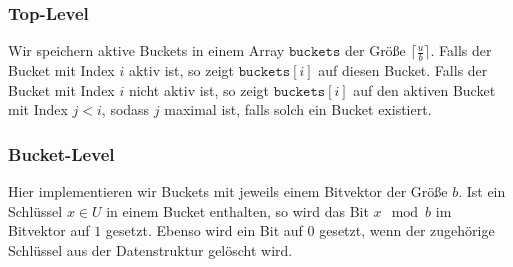 \subsubsection{Top-Level}

Wir speichern aktive Buckets in einem Array $\texttt{buckets}$ der Größe $\lceil \tfrac{u}{b} \rceil$. Falls der Bucket mit Index $i$ aktiv ist, so zeigt $\texttt{buckets}[i]$ auf diesen Bucket. Falls der Bucket mit Index $i$ nicht aktiv ist, so zeigt $\texttt{buckets}[i]$ auf den aktiven Bucket mit Index $j < i$, sodass $j$ maximal ist, falls solch ein Bucket existiert.

\subsubsection{Bucket-Level}

Hier implementieren wir Buckets mit jeweils einem Bitvektor der Größe $b$. Ist ein Schlüssel $x \in U$ in einem Bucket enthalten, so wird das Bit $x \mod b$ im Bitvektor auf $1$ gesetzt. Ebenso wird ein Bit auf $0$ gesetzt, wenn der zugehörige Schlüssel aus der Datenstruktur gelöscht wird.


